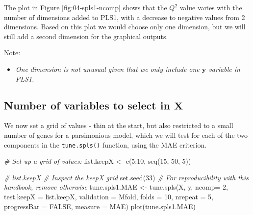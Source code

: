 \documentclass[
]{book}
\newenvironment{Shaded}{\begin{snugshade}}{\end{snugshade}}
\newcommand{\AttributeTok}[1]{\textcolor[rgb]{0.77,0.63,0.00}{#1}}
\newcommand{\CommentTok}[1]{\textcolor[rgb]{0.56,0.35,0.01}{\textit{#1}}}
\newcommand{\ConstantTok}[1]{\textcolor[rgb]{0.00,0.00,0.00}{#1}}
\newcommand{\DecValTok}[1]{\textcolor[rgb]{0.00,0.00,0.81}{#1}}
\newcommand{\FunctionTok}[1]{\textcolor[rgb]{0.00,0.00,0.00}{#1}}
\newcommand{\NormalTok}[1]{#1}
\newcommand{\OtherTok}[1]{\textcolor[rgb]{0.56,0.35,0.01}{#1}}
\newcommand{\SpecialCharTok}[1]{\textcolor[rgb]{0.00,0.00,0.00}{#1}}
\newcommand{\StringTok}[1]{\textcolor[rgb]{0.31,0.60,0.02}{#1}}
\providecommand{\tightlist}{%
  \setlength{\itemsep}{0pt}\setlength{\parskip}{0pt}}
\begin{document}
The plot in Figure \ref{fig:04-spls1-ncomp} shows that the \(Q^2\) value varies with the number of dimensions added to PLS1, with a decrease to negative values from 2 dimensions. Based on this plot we would choose only one dimension, but we will still add a second dimension for the graphical outputs.

Note:

\begin{itemize}
\tightlist
\item
  \emph{One dimension is not unusual given that we only include one \(\boldsymbol y\) variable in PLS1.}
\end{itemize}

\hypertarget{04:spls1-tuning}{%
\subsection{\texorpdfstring{Number of variables to select in \(\boldsymbol X\)}{Number of variables to select in \textbackslash boldsymbol X}}\label{04:spls1-tuning}}

We now set a grid of values - thin at the start, but also restricted to a small number of genes for a parsimonious model, which we will test for each of the two components in the \texttt{tune.spls()} function, using the MAE criterion.

\begin{Shaded}
\begin{Highlighting}[]
\CommentTok{\# Set up a grid of values: }
\NormalTok{list.keepX }\OtherTok{\textless{}{-}} \FunctionTok{c}\NormalTok{(}\DecValTok{5}\SpecialCharTok{:}\DecValTok{10}\NormalTok{, }\FunctionTok{seq}\NormalTok{(}\DecValTok{15}\NormalTok{, }\DecValTok{50}\NormalTok{, }\DecValTok{5}\NormalTok{))     }

\CommentTok{\# list.keepX  \# Inspect the keepX grid}
\FunctionTok{set.seed}\NormalTok{(}\DecValTok{33}\NormalTok{)  }\CommentTok{\# For reproducibility with this handbook, remove otherwise}
\NormalTok{tune.spls1.MAE }\OtherTok{\textless{}{-}} \FunctionTok{tune.spls}\NormalTok{(X, y, }\AttributeTok{ncomp=} \DecValTok{2}\NormalTok{, }
                            \AttributeTok{test.keepX =}\NormalTok{ list.keepX, }
                            \AttributeTok{validation =} \StringTok{\textquotesingle{}Mfold\textquotesingle{}}\NormalTok{, }
                            \AttributeTok{folds =} \DecValTok{10}\NormalTok{,}
                            \AttributeTok{nrepeat =} \DecValTok{5}\NormalTok{, }
                            \AttributeTok{progressBar =} \ConstantTok{FALSE}\NormalTok{, }
                            \AttributeTok{measure =} \StringTok{\textquotesingle{}MAE\textquotesingle{}}\NormalTok{)}
\FunctionTok{plot}\NormalTok{(tune.spls1.MAE)}
\end{Highlighting}
\end{Shaded}
\end{document}
